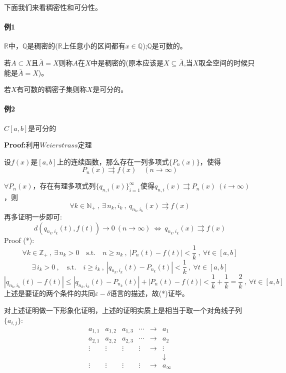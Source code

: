 下面我们来看稠密性和可分性。

\paragraph*{例1} \quad $\mathbb{R}$中，$\mathbb{Q}$是稠密的($\mathbb{R}$上任意小的区间都有$x \in \mathbb{Q}$);$\mathbb{Q}$是可数的。
\begin{definition}[稠密性]
    若$A \subset X$且$\bar{A}=X$则称$A$在$X$中是稠密的(原本应该是$X \subseteq \bar{A}$,当$X$取全空间的时候只能是$\bar{A}=X$)。
\end{definition}
\begin{definition}[可分性]
    若$X$有可数的稠密子集则称$X$是可分的。
\end{definition}
\paragraph*{例2} \quad $C[a,b]$是可分的

\textbf{Proof:}利用$Weierstrass$定理
\begin{theorem}[$Weierstrass$定理]
    设$f(x)$是$[a,b]$上的连续函数，那么存在一列多项式$\{P_n(x)\}$，使得
    \[P_n(x) \rightrightarrows f(x) \quad (n \rightarrow \infty)\]
\end{theorem}
$\forall P_n(x)$，存在有理多项式列$\{q_{n,i}(x)\}_{i=1}^{\infty}$使得$q_{n,i}(x) \rightrightarrows P_n(x) \ (i \rightarrow \infty)$，则
\[\forall k \in \mathbb{N}_+ \ , \ \exists \, n_k,i_k \ , \ q_{n_k,i_k}(x) \rightrightarrows f(x)\]
再多证明一步即可:
\[d(q_{n_k,i_k}(t),f(t)) \rightarrow 0 \ (n \rightarrow \infty) \ \Leftrightarrow \ q_{n_k,i_k}(x) \rightrightarrows f(x) \tag{*}\]
Proof (*):
\[\forall k \in \mathbb{Z}_+ \ , \ \exists \, n_k>0 \quad \text{s.t.} \quad n \geq n_k \ , \ |P_n(t)-f(t)|<\frac{1}{k} \ , \ \forall t \in [a,b]\]
\[\exists \, i_k>0 \ , \quad \text{s.t.} \quad i \geq i_k \ , \ |q_{n_k,i_k}(t)-P_{n_k}(t)|<\frac{1}{k} \ , \ \forall t \in [a,b]\]
\[|q_{n_k,i_k}(t)-f(t)| \leq |q_{n_k,i_k}(t)-P_{n_k}(t)|+|P_n(t)-f(t)|<\frac{1}{k}+\frac{1}{k}=\frac{2}{k} \ , \ \forall t \in [a,b]\]
上述是要证的两个条件的共同$\varepsilon-\delta$语言的描述，故(*)证毕。

对上述证明做一下形象化证明，上述的证明实质上是相当于取一个对角线子列$\{a_{i,j}\}$:
\[
\begin{array}{cccccc}
    a_{1,1} & a_{1,2} & a_{1,3} & \cdots & \rightarrow & a_1 \\
    a_{2,1} & a_{2,2} & a_{2,3} & \cdots & \rightarrow & a_2 \\
    \vdots & \vdots & \vdots & \vdots & \rightarrow & \vdots \\
      &   &   &   &   & \downarrow \\
    \vdots & \vdots & \vdots & \vdots & \rightarrow & a_{\infty}
\end{array}    
\]

